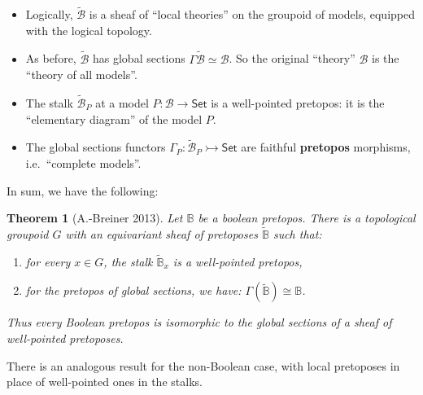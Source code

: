 \documentclass[11pt]{article}
\newcommand{\B}{\ensuremath{\mathbb{B}}}
\newcommand{\Set}{\ensuremath{\mathsf{Set}}}
\newtheorem{theorem}{Theorem}
\theoremstyle{remark}
\theoremstyle{definition}
\newcommand{\myemph}[1]{\textbf{#1}}
\begin{document}
\begin{itemize}
\item Logically, $\tilde{\mathcal{B}}$ is a sheaf of ``local theories'' on the groupoid of models, equipped with the logical topology.  

\item As before, $\tilde{\mathcal{B}}$ has global sections $\Gamma\tilde{\mathcal{B}} \simeq \mathcal{B}$.  So the original ``theory'' $\mathcal{B}$ is the ``theory of all models''.

\item The stalk $\tilde{\mathcal{B}}_P$ at a model $P : \mathcal{B} \to \Set$ is a well-pointed pretopos: it is the ``elementary diagram'' of the model $P$.
\medskip

\item The global sections functors $\Gamma_P : \tilde{\mathcal{B}}_P \rightarrowtail \Set$ are faithful \myemph{pretopos} morphisms, i.e.\ ``complete models''.

\end{itemize}

In sum, we have the following:

\begin{theorem}[A.-Breiner 2013]
Let $\B$ be a boolean pretopos.  
There is a topological groupoid $G$ with an equivariant sheaf of pretoposes $\tilde{\B}$ such that:
\begin{enumerate}
\item for every $x\in G$, the stalk $\tilde{\B}_x$ is a well-pointed pretopos, 
\item for the pretopos of global sections, we have: $\Gamma(\tilde{\B}) \cong \B$.
\end{enumerate}
Thus every Boolean pretopos is isomorphic to the global sections of a sheaf of well-pointed pretoposes.  
\end{theorem}
\medskip

There is an analogous result for the non-Boolean case, with local pretoposes in place of well-pointed ones in the stalks.

\end{document}
